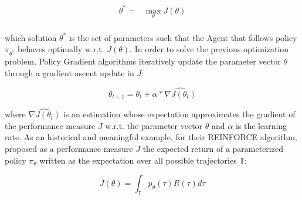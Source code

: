                 \begin{align*}  
                    \theta^{*} =    &\max_{\theta} J(\theta) \\
                \end{align*}
                
                which solution $\theta^*$ is the set of parameters such that the Agent that follows policy $\pi_{\theta^*}$ behaves optimally w.r.t. $J(\theta)$. In order to solve the previous optimization problem, Policy Gradient algorithms iteratively update the parameter vector $\theta$ through a gradient ascent update in $J$:
                
                \[ \theta_{t+1} = \theta_{t} + \alpha * \widehat{\nabla J(\theta_{t})} \]
                
                where $\widehat{\nabla J(\theta_{t})}$ is an estimation whose expectation approximates the gradient of the performance measure $J$ w.r.t. the parameter vector $\theta$ and $\alpha$ is the learning rate. \newline
                As an historical and meaningful example, for their REINFORCE algorithm,  proposed as a performance measure $J$ the expected return of a parameterized policy $\pi_\theta$ written as the expectation over all possible trajectories $\mathbb{T}$:
                
                \[ J(\theta) = \int_{\mathbb{T}} p_{\theta}(\tau) R(\tau) d\tau \]
                
